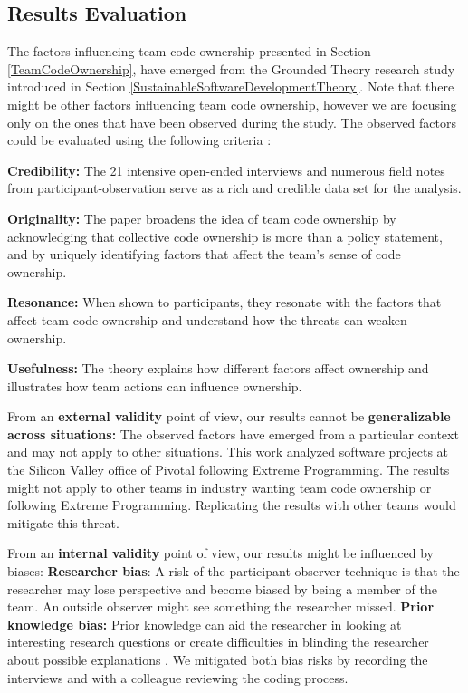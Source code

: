 \subsection{Results Evaluation}

The factors influencing team code ownership presented in Section \ref{TeamCodeOwnership}, have emerged from the Grounded Theory research study introduced in Section \ref{SustainableSoftwareDevelopmentTheory}. Note that there might be other factors influencing team code ownership, however we are focusing only on the ones that have been observed during the study. The observed factors could be evaluated using the following criteria \cite{StolGTinSE}: 

\textbf{Credibility:}  The 21 intensive open-ended interviews and numerous field notes from participant-observation serve as a rich and credible data set for the analysis. 

\textbf{Originality:} The paper broadens the idea of team code ownership by acknowledging that collective code ownership is more than a policy statement, and by uniquely identifying factors that affect the team's sense of code ownership.

\textbf{Resonance:} When shown to participants, they resonate with the factors that affect team code ownership and understand how the threats can weaken ownership.

\textbf{Usefulness:} The theory explains how different factors affect ownership and illustrates how team actions can influence ownership. 

From an \textbf{external validity} point of view, our results cannot be \textbf{generalizable across situations:} The observed factors have emerged from a particular context and may not apply to other situations. This work analyzed software projects at the Silicon Valley office of Pivotal following Extreme Programming. The results might not apply to other teams in industry wanting team code ownership or following Extreme Programming. Replicating the results with other teams would mitigate this threat. 

From an \textbf{internal validity} point of view, our results might be influenced by biases:
\textbf{Researcher bias}: A risk of the participant-observer technique is that the researcher may lose perspective and become biased by being a member of the team. An outside observer might see something the researcher missed. 
\textbf{Prior knowledge bias:} Prior knowledge can aid the researcher in looking at interesting research questions or create difficulties in blinding the researcher about possible explanations \cite{GlaserIssues}. 
We mitigated both bias risks by recording the interviews and with a colleague reviewing the coding process. 

